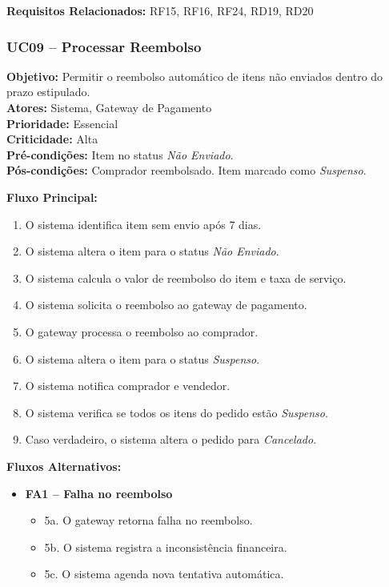 ﻿\documentclass[12pt,a4paper]{article}
\begin{document}
\vspace{0.5em}
\noindent\textbf{Requisitos Relacionados:} RF15, RF16, RF24, RD19, RD20


\subsubsection{UC09 – Processar Reembolso}
\label{uc:07}
\noindent\textbf{Objetivo:} Permitir o reembolso automático de itens não enviados dentro do prazo estipulado.\\
\textbf{Atores:} Sistema, Gateway de Pagamento\\
\textbf{Prioridade:} Essencial\\
\textbf{Criticidade:} Alta\\
\textbf{Pré-condições:} Item no status \textit{Não Enviado}.\\
\textbf{Pós-condições:} Comprador reembolsado. Item marcado como \textit{Suspenso}.

\vspace{0.5em}
\noindent\textbf{Fluxo Principal:}
\begin{enumerate}[label=\arabic*.]
    \item O sistema identifica item sem envio após 7 dias.
    \item O sistema altera o item para o status \textit{Não Enviado}.
    \item O sistema calcula o valor de reembolso do item e taxa de serviço.
    \item O sistema solicita o reembolso ao gateway de pagamento.
    \item O gateway processa o reembolso ao comprador.
    \item O sistema altera o item para o status \textit{Suspenso}.
    \item O sistema notifica comprador e vendedor.
    \item O sistema verifica se todos os itens do pedido estão \textit{Suspenso}.
    \item Caso verdadeiro, o sistema altera o pedido para \textit{Cancelado}.
\end{enumerate}

\vspace{0.5em}
\noindent\textbf{Fluxos Alternativos:}
\begin{itemize}[leftmargin=*]
    \item \textbf{FA1 – Falha no reembolso}
    \begin{itemize}[label={}, leftmargin=0.5cm]
        \item 5a. O gateway retorna falha no reembolso.
        \item 5b. O sistema registra a inconsistência financeira.
        \item 5c. O sistema agenda nova tentativa automática.
    \end{itemize}
\end{itemize}
\end{document}
